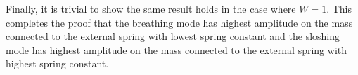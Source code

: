 \documentclass[12pt,draft]{../style-files/ociamthesis}
\begin{document}
Finally, it is trivial to show the same result holds in the case where $W = 1$. This completes the proof that the breathing mode has highest amplitude on the mass connected to the external spring with lowest spring constant and the sloshing mode has highest amplitude on the mass connected to the external spring with highest spring constant.



  
\end{document}
